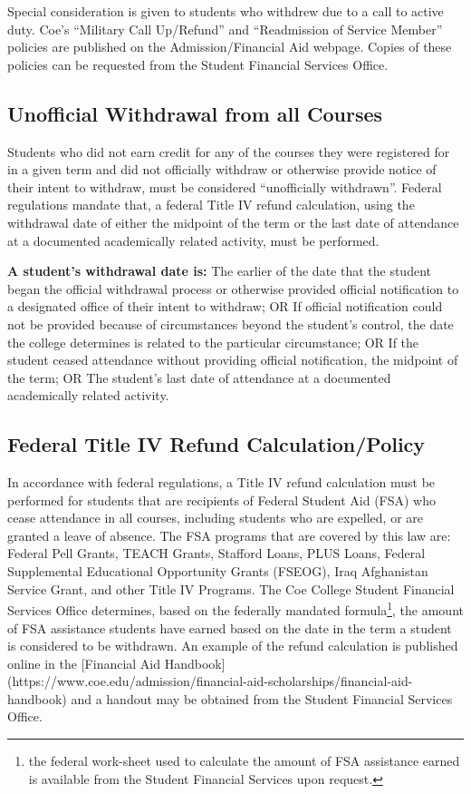 \documentclass[
  letterpaper,
]{scrbook}
\begin{document}
Special consideration is given to students who withdrew due to a call to
active duty. Coe's ``Military Call Up/Refund'' and ``Readmission of
Service Member'' policies are published on the Admission/Financial Aid
webpage. Copies of these policies can be requested from the Student
Financial Services Office.

\subsection{Unofficial Withdrawal from all
Courses}\label{unofficial-withdrawal-from-all-courses}

Students who did not earn credit for any of the courses they were
registered for in a given term and did not officially withdraw or
otherwise provide notice of their intent to withdraw, must be considered
``unofficially withdrawn''. Federal regulations mandate that, a federal
Title IV refund calculation, using the withdrawal date of either the
midpoint of the term or the last date of attendance at a documented
academically related activity, must be performed.

\textbf{A student's withdrawal date is:} The earlier of the date that
the student began the official withdrawal process or otherwise provided
official notification to a designated office of their intent to
withdraw; OR If official notification could not be provided because of
circumstances beyond the student's control, the date the college
determines is related to the particular circumstance; OR If the student
ceased attendance without providing official notification, the midpoint
of the term; OR The student's last date of attendance at a documented
academically related activity.

\subsection{Federal Title IV Refund
Calculation/Policy}\label{sec-federal-title-IV-refund-calculation-policy}

In accordance with federal regulations, a Title IV refund calculation
must be performed for students that are recipients of Federal Student
Aid (FSA) who cease attendance in all courses, including students who
are expelled, or are granted a leave of absence. The FSA programs that
are covered by this law are: Federal Pell Grants, TEACH Grants, Stafford
Loans, PLUS Loans, Federal Supplemental Educational Opportunity Grants
(FSEOG), Iraq Afghanistan Service Grant, and other Title IV Programs.
The Coe College Student Financial Services Office determines, based on
the federally mandated formula\footnote{the federal work-sheet used to
  calculate the amount of FSA assistance earned is available from the
  Student Financial Services upon request.}, the amount of FSA
assistance students have earned based on the date in the term a student
is considered to be withdrawn. An example of the refund calculation is
published online in the {[}Financial Aid Handbook{]}
(https://www.coe.edu/admission/financial-aid-scholarships/financial-aid-handbook)
and a handout may be obtained from the Student Financial Services
Office.
\end{document}
